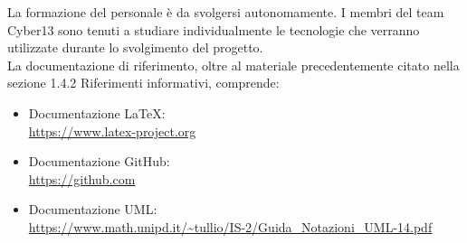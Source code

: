 La formazione del personale è da svolgersi autonomamente. I membri del team Cyber13 sono tenuti a studiare individualmente le tecnologie che verranno utilizzate durante lo svolgimento del progetto.\\
La documentazione di riferimento, oltre al materiale precedentemente citato nella sezione 1.4.2 Riferimenti informativi, comprende:
    \begin{itemize}
        \item Documentazione LaTeX: \\
              \url{https://www.latex-project.org}
        \item Documentazione GitHub: \\
              \url{https://github.com}
        \item Documentazione UML: \\
            \url{https://www.math.unipd.it/~tullio/IS-2/Guida_Notazioni_UML-14.pdf}
    \end{itemize}